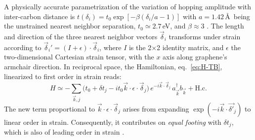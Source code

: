 A physically accurate parametrization of the variation of hopping amplitude with inter-carbon distance is $t(\delta_i)=t_0 \exp[-\beta (\delta_i/a-1)]$ with $a=1.42$\,\AA\, being the unstrained nearest neighbor separation, $t_0\simeq 2.7$\,eV, and $\beta\approx 3$ \cite{Pereira2009,Ribeiro2009,CastroNeto2009}.
The length and direction of the three nearest neighbor vectors $\vec{\delta}_i$ transforms under strain according to $\vec{\delta}_i'=(I+\epsilon)\cdot\vec{\delta}_i$, where $I$ is the 2$\times$2 identity matrix, and $\epsilon$ the two-dimensional Cartesian strain tensor, with the $x$ axis along graphene's armchair direction.
In reciprocal space, the Hamiltonian, eq.~\eqref{eq:H-TB}, linearized to first order in strain reads:
\begin{equation}
  H \simeq -\sum_{\vec{k},j} \bigl(
  t_0 + \delta t_j - it_0\vec{k}\cdot\epsilon\cdot\vec{\delta}_j
  \bigr) \, e^{-i\vec{k}\cdot\vec{\delta}_j} \,
  a_{\vec{k}}^{\dagger}b_{\vec{k}} + \text{H.c.}
  \label{eq:H-TB-strain}
\end{equation}
The new term proportional to $\vec{k}\cdot\epsilon\cdot\vec{\delta}_j$ arises from expanding $\exp(-i\vec{k}\cdot\vec{\delta'}_j)$ to linear order in strain. Consequently, it contributes on \emph{equal footing} with $\delta t_j$, which is also of leading order in strain \cite{CastroNeto2009}.

